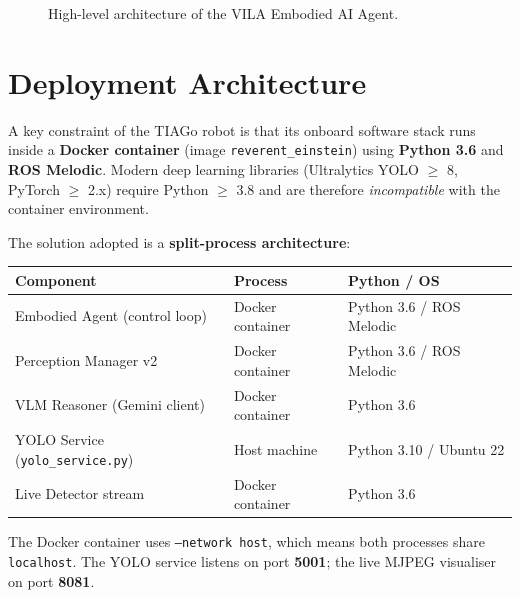 \documentclass[12pt,a4paper]{report}
\begin{document}
\begin{figure}[H]
\caption{High-level architecture of the VILA Embodied AI Agent.}
\label{fig:arch}
\end{figure}

\section{Deployment Architecture}

A key constraint of the TIAGo robot is that its onboard software stack runs inside a
\textbf{Docker container} (image \texttt{reverent\_einstein}) using
\textbf{Python 3.6} and \textbf{ROS Melodic}.  Modern deep learning libraries (Ultralytics
YOLO $\geq$ 8, PyTorch $\geq$ 2.x) require Python $\geq$ 3.8 and are therefore
\emph{incompatible} with the container environment.

The solution adopted is a \textbf{split-process architecture}:

\begin{center}
\begin{tabular}{lll}
\toprule
\textbf{Component} & \textbf{Process} & \textbf{Python / OS} \\
\midrule
Embodied Agent (control loop) & Docker container & Python 3.6 / ROS Melodic \\
Perception Manager v2         & Docker container & Python 3.6 / ROS Melodic \\
VLM Reasoner (Gemini client)  & Docker container & Python 3.6 \\
YOLO Service (\texttt{yolo\_service.py}) & Host machine   & Python 3.10 / Ubuntu 22 \\
Live Detector stream           & Docker container & Python 3.6 \\
\bottomrule
\end{tabular}
\end{center}

The Docker container uses \texttt{--network host}, which means both processes share
\texttt{localhost}.  The YOLO service listens on port \textbf{5001}; the live MJPEG
visualiser on port \textbf{8081}.

\end{document}
